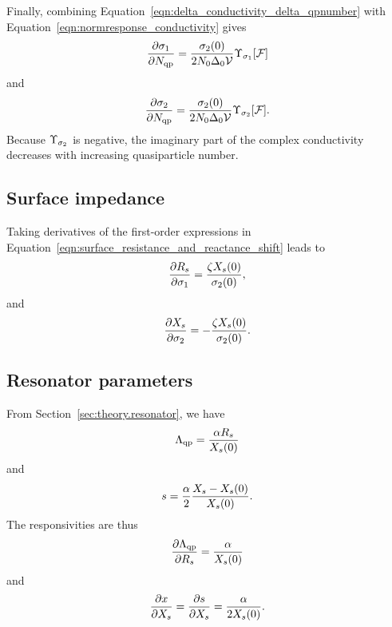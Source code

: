 Finally, combining Equation~\ref{eqn:delta_conductivity_delta_qpnumber} with Equation~\ref{eqn:normresponse_conductivity} gives
\begin{equation}
\pdv{\sigma_1}{N_{\mathrm{qp}}}
  =
  \frac{\sigma_2(0)}{2 N_0 \Delta_0 \mathcal{V}} \Upsilon_{\sigma_1}[\mathcal{F}]
\label{eqn:delta_reconductivity_delta_qpnumber_normresponse}
\end{equation}
and
\begin{equation}
\pdv{\sigma_2}{N_{\mathrm{qp}}}
  =
  \frac{\sigma_2(0)}{2 N_0 \Delta_0 \mathcal{V}} \Upsilon_{\sigma_2}[\mathcal{F}].
\label{eqn:delta_imconductivity_delta_qpnumber_normresponse}
\end{equation}
Because $\Upsilon_{\sigma_2}$ is negative, the imaginary part of the complex conductivity decreases with increasing quasiparticle number.


\subsection{Surface impedance}
\label{sec:theory.response.surface_impedance}

Taking derivatives of the first-order expressions in Equation~\ref{eqn:surface_resistance_and_reactance_shift} leads to
\begin{equation}
\pdv{R_s}{\sigma_1}
  =
  \frac{\zeta X_s(0)}{\sigma_2(0)},
\end{equation}
and
\begin{equation}
\pdv{X_s}{\sigma_2}
  =
  - \frac{\zeta X_s(0)}{\sigma_2(0)}.
\end{equation}


\subsection{Resonator parameters}
\label{sec:theory.response.resonator}

From Section~\ref{sec:theory.resonator}, we have
\begin{equation}
\Lambda_{\mathrm{qp}}
  =
  \frac{\alpha R_s}{X_s(0)}
\end{equation}
and
\begin{equation}
s
  =
  \frac{\alpha}{2} \frac{X_s - X_s(0)}{X_s(0)}.
\end{equation}
The responsivities are thus
\begin{equation}
\pdv{\Lambda_{\mathrm{qp}}}{R_s}
  =
  \frac{\alpha}{X_s(0)}
\label{eqn:delta_loss_internal_delta_resistance_surface}
\end{equation}
and
\begin{equation}
\pdv{x}{X_s}
  =
  \pdv{s}{X_s}
  =
  \frac{\alpha}{2 X_s(0)}.
\label{eqn:delta_detuning_delta_reactance_surface}
\end{equation}


